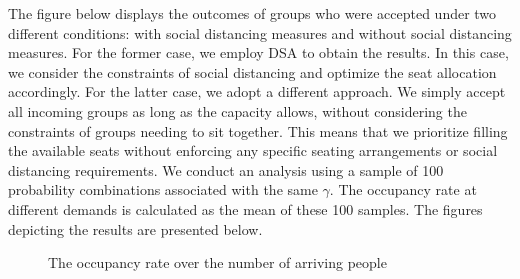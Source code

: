 The figure below displays the outcomes of groups who were accepted under two different conditions: with social distancing measures and without social distancing measures. For the former case, we employ DSA to obtain the results. In this case, we consider the constraints of social distancing and optimize the seat allocation accordingly. For the latter case, we adopt a different approach. We simply accept all incoming groups as long as the capacity allows, without considering the constraints of groups needing to sit together. This means that we prioritize filling the available seats without enforcing any specific seating arrangements or social distancing requirements. We conduct an analysis using a sample of 100 probability combinations associated with the same $\gamma$. The occupancy rate at different demands is calculated as the mean of these 100 samples. The figures depicting the results are presented below.


\begin{figure}[h]
  \centering
  \caption{The occupancy rate over the number of arriving people}
  \label{Fig.lable}
\end{figure}

